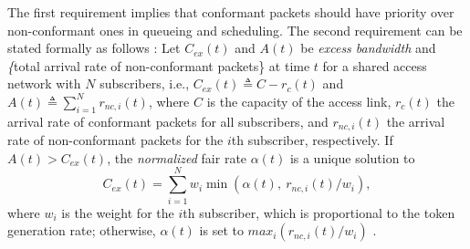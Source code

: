 \documentclass[conference,twoside,final]{IEEEtran}
\begin{document}
The first requirement implies that conformant packets should have priority over
non-conformant ones in queueing and scheduling. The second requirement can be
stated formally as follows \cite{Kim:14-1}: Let \(C_{ex}(t)\) and \(A(t)\) be
\textit{excess bandwidth} and \textit\{total arrival rate of non-conformant
packets\} at time \(t\) for a shared access network with \(N\) subscribers, i.e.,
\(C_{ex}(t)\triangleq C-r_{c}(t)\)
and \(A(t) \triangleq \sum_{i=1}^{N} r_{nc,i}(t)\),
where \(C\) is the capacity of the access link, \(r_{c}(t)\) the arrival rate of
conformant packets for all subscribers, and \(r_{nc,i}(t)\) the arrival rate of
non-conformant packets for the \(i\)th subscriber, respectively. If
\(A(t)>C_{ex}(t)\), the \textit{normalized} fair rate \(\alpha(t)\) is a unique
solution to
\begin{equation}
    C_{ex}(t) = \sum_{i=1}^{N} w_i \min(\alpha(t),~r_{nc,i}(t)/w_i) ,
    \label{eq:fair_rate}
\end{equation}
where \(w_i\) is the weight for the \(i\)th subscriber, which is proportional to the
token generation rate; otherwise, \(\alpha(t)\) is set to
\(max_i\left(r_{nc,i}(t)/w_i\right)\) \cite{stoica03:_core}.
\end{document}
